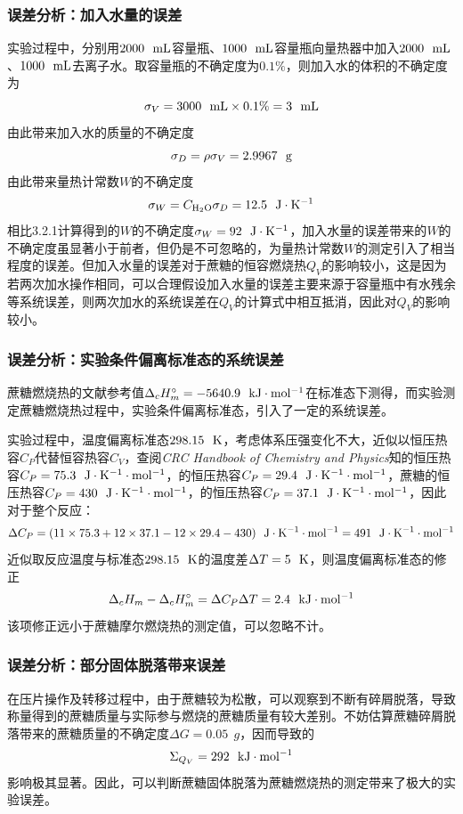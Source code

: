 \documentclass[12pt]{article}
\begin{document}
 			\subsubsection{误差分析：加入水量的误差}
 		实验过程中，分别用$2000\ \ {\rm mL}$容量瓶、$1000\ \ {\rm mL}$容量瓶向量热器中加入$2000\ \ {\rm mL}$、$1000\ \ {\rm mL}$去离子水。取容量瓶的不确定度为$0.1\%$，则加入水的体积的不确定度为
 		$$
 		\sigma_{V}=3000\ \ {\rm mL} \times 0.1\% =3 \ \ {\rm mL}
 		$$
 		由此带来加入水的质量的不确定度
 		$$
 		\sigma_{D}=\rho \sigma_{V}=2.9967\ \ {\rm g}
 		$$
 		由此带来量热计常数$W$的不确定度
 		$$
 		\sigma_{W}=C_{\rm H_{2}O}\sigma_{D}=12.5\ \ {\rm J\cdot K^{-1}}
 		$$
 		相比3.2.1计算得到的$W$的不确定度$\sigma_{W}=92\ \ {\rm J\cdot K^{-1}}$，加入水量的误差带来的$W$的不确定度虽显著小于前者，但仍是不可忽略的，为量热计常数$W$的测定引入了相当程度的误差。但加入水量的误差对于蔗糖的恒容燃烧热$Q_{V}$的影响较小，这是因为若两次加水操作相同，可以合理假设加入水量的误差主要来源于容量瓶中有水残余等系统误差，则两次加水的系统误差在$Q_{V}$的计算式中相互抵消，因此对$Q_{V}$的影响较小。
 	\subsubsection{误差分析：实验条件偏离标准态的系统误差}
 	蔗糖燃烧热的文献参考值$\Delta_{c}H^{\circ}_{m}=-5640.9\ \ {\rm kJ\cdot mol^{-1}}$在标准态下测得，而实验测定蔗糖燃烧热过程中，实验条件偏离标准态，引入了一定的系统误差。\par 
 	实验过程中，温度偏离标准态$298.15\ \ {\rm K}$，考虑体系压强变化不大，近似以恒压热容$C_{P}$代替恒容热容$C_{V}$，查阅\textit{CRC Handbook of Chemistry and Physics}\citealp{crc}知的恒压热容$C_{P}=75.3\ \ {\rm J\cdot K^{-1} \cdot mol^{-1}}$，的恒压热容$C_{P}=29.4\ \ {\rm J\cdot K^{-1} \cdot mol^{-1}}$，蔗糖的恒压热容$C_{P}=430\ \ {\rm J\cdot K^{-1} \cdot mol^{-1}}$，的恒压热容$C_{P}=37.1\ \ {\rm J\cdot K^{-1} \cdot mol^{-1}}$，因此对于整个反应：
 	$$\Delta C_{P}=(11\times 75.3+12\times 37.1-12\times 29.4-430)\ \ {\rm J\cdot K^{-1} \cdot mol^{-1}}=491\ \ {\rm J\cdot K^{-1} \cdot mol^{-1}}
 	$$
 	近似取反应温度与标准态$298.15\ \ {\rm K}$的温度差$\Delta T=5\ \ {\rm K}$，则温度偏离标准态的修正
 	$$
 	\Delta_{c}H_{m}-\Delta_{c}H^{\circ}_{m}=\Delta C_{P} \Delta T=2.4\ \ {\rm kJ\cdot mol^{-1}}
 	$$
	该项修正远小于蔗糖摩尔燃烧热的测定值，可以忽略不计。
		\subsubsection{误差分析：部分固体脱落带来误差}
		在压片操作及转移过程中，由于蔗糖较为松散，可以观察到不断有碎屑脱落，导致称量得到的蔗糖质量与实际参与燃烧的蔗糖质量有较大差别。不妨估算蔗糖碎屑脱落带来的蔗糖质量的不确定度$\Delta G=0.05\ \ {g}$，因而导致的
		$$
		\Sigma_{Q_{V}}=292\ \ {\rm kJ\cdot mol^{-1}}
		$$
		影响极其显著。因此，可以判断蔗糖固体脱落为蔗糖燃烧热的测定带来了极大的实验误差。
 			
\end{document}
